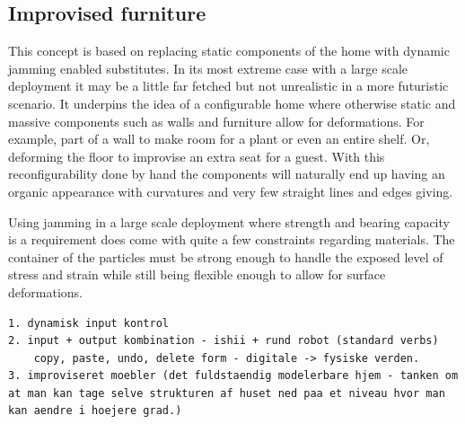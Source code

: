 \subsection{Improvised furniture}
\label{ch:jamming:concepts:improvised_furniture}

This concept is based on replacing static components of the home with dynamic jamming enabled substitutes.
In its most extreme case with a large scale deployment it may be a little far fetched but not unrealistic in a more futuristic scenario.
It underpins the idea of a configurable home where otherwise static and massive components such as walls and furniture allow for deformations.
For example,  part of a wall to make room for a plant or even an entire shelf.
Or, deforming the floor to improvise an extra seat for a guest.
With this reconfigurability done by hand the components will naturally end up having an organic appearance with curvatures and very few straight lines and edges giving.

Using jamming in a large scale deployment where strength and bearing capacity is a requirement does come with quite a few constraints regarding materials.
The container of the particles must be strong enough to handle the exposed level of stress and strain while still being flexible enough to allow for surface deformations.

\begin{verbatim}
1. dynamisk input kontrol
2. input + output kombination - ishii + rund robot (standard verbs)
	copy, paste, undo, delete form - digitale -> fysiske verden.
3. improviseret moebler (det fuldstaendig modelerbare hjem - tanken om at man kan tage selve strukturen af huset ned paa et niveau hvor man kan aendre i hoejere grad.)

\end{verbatim}

